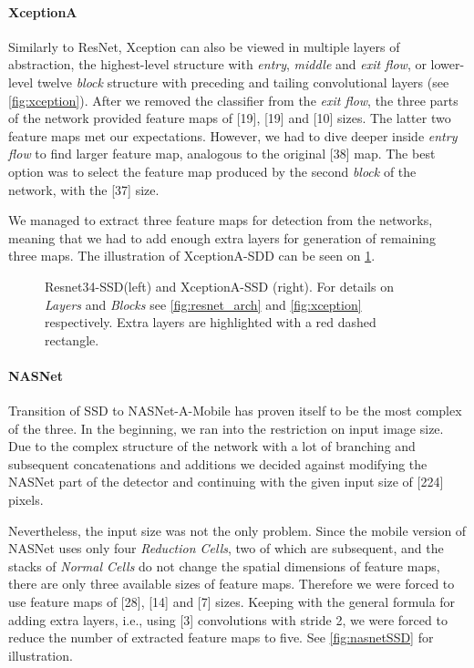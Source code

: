 \paragraph{XceptionA} Similarly to ResNet, Xception can also be viewed in multiple layers of abstraction, the highest-level structure with \textit{entry}, \textit{middle} and \textit{exit flow}, or lower-level twelve \textit{block} structure with preceding and tailing convolutional layers (see \cref{fig:xception}). After we removed the classifier from the \textit{exit flow}, the three parts of the network provided feature maps of [19], [19] and [10] sizes. The latter two feature maps met our expectations. However, we had to dive deeper inside \textit{entry flow} to find larger feature map, analogous to the original [38] map. The best option was to select the feature map produced by the second \textit{block} of the network, with the [37] size. 

We managed to extract three feature maps for detection from the networks, meaning that we had to add enough extra layers for generation of remaining three maps. The illustration of XceptionA-SDD can be seen on \cref{fig:resnet_xception_SSD}.


\begin{figure}
    \centering
    \resnetSSD
    \caption[Resnet34-SSD and XceptionA-SSD]%
    {Resnet34-SSD(left) and XceptionA-SSD (right). For details on \textit{Layers} and \textit{Blocks} see \cref{fig:resnet_arch} and \cref{fig:xception} respectively. Extra layers are highlighted with a red dashed rectangle.}

    \label{fig:resnet_xception_SSD}
\end{figure}

\paragraph{NASNet} Transition of SSD to NASNet-A-Mobile has proven itself to be the most complex of the three. In the beginning, we ran into the restriction on input image size. Due to the complex structure of the network with a lot of branching and subsequent concatenations and additions we decided against modifying the NASNet part of the detector and continuing with the given input size of [224] pixels.

Nevertheless, the input size was not the only problem. Since the mobile version of NASNet uses only four \textit{Reduction Cells}, two of which are subsequent, and the stacks of \textit{Normal Cells} do not change the spatial dimensions of feature maps, there are only three available sizes of feature maps. Therefore we were forced to use feature maps of [28], [14] and [7] sizes. Keeping with the general formula for adding extra layers, i.e., using [3] convolutions with stride 2, we were forced to reduce the number of extracted feature maps to five. See \cref{fig:nasnetSSD} for illustration.


